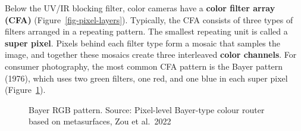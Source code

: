 \documentclass[
  letterpaper,
]{book}
\begin{document}
Below the UV/IR blocking filter, color cameras have a \textbf{color
filter array (CFA)} (Figure~\ref{fig-pixel-layers}). Typically, the CFA
consists of three types of filters arranged in a repeating pattern. The
smallest repeating unit is called a \textbf{super pixel}. Pixels behind
each filter type form a mosaic that samples the image, and together
these mosaics create three interleaved \textbf{color channels}. For
consumer photography, the most common CFA pattern is the Bayer pattern
(1976), which uses two green filters, one red, and one blue in each
super pixel (Figure~\ref{fig-cfa-pattern}).

\begin{figure}


\caption{\label{fig-cfa-pattern}Bayer RGB pattern. Source: Pixel-level
Bayer-type colour router based on metasurfaces, Zou et al.~2022}

\end{figure}%
\end{document}

